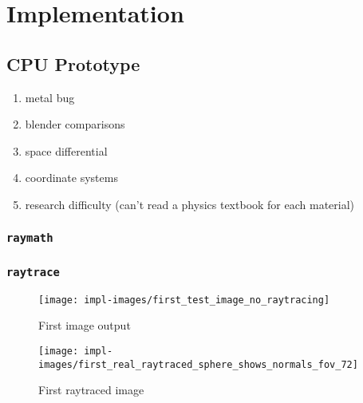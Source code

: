 %
%
%
\chapter{Implementation}\label{ch:implementation}

\section{CPU Prototype}\label{ch:implementation:prototype}

\begin{enumerate}
  \item metal bug
  \item blender comparisons
  \item space differential
  \item coordinate systems
  \item research difficulty (can't read a physics textbook for each material)
\end{enumerate}

\subsection{\texttt{raymath}}\label{ch:implementation:prototype:raymath}

\subsection{\texttt{raytrace}}\label{ch:implementation:prototype:raytrace}

\vspace{0.3em}
\begin{figure}[htb]
  \centering
  \texttt{[image: impl-images/first\_test\_image\_no\_raytracing]}
  \caption{First image output}
  \label{fig:rayterm-cpu_ppm_output_first}
\end{figure}

\vspace{0.3em}
\begin{figure}[htb]
  \centering
  \texttt{[image: impl-images/first\_real\_raytraced\_sphere\_shows\_normals\_fov\_72]}
  \caption{First raytraced image}
  \label{fig:rayterm-cpu_first_raytraced_image}
\end{figure}


